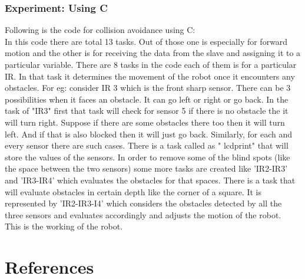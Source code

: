 \documentclass[11pt,a4paper]{book}
\begin{document}
	\subsubsection{Experiment: Using C}
	Following is the code for collision avoidance using C:\\
	
	\newpage
	In this code there are total 13 tasks. Out of those one is especially for forward motion and the other is for receiving the data from the slave and assigning it to a particular variable. There are 8 tasks in the code each of them is for a particular IR. In that task it determines the movement of the robot once it encounters any obstacles. For eg: consider IR 3 which is the front sharp sensor. There can be 3 possibilities when it faces an obstacle. It can go left or right or go back. In the task of "IR3" first that task will check for sensor 5 if there is no obstacle the it will turn right. Suppose if there are some obstacles there too then it will turn left. And if that is also blocked then it will just go back. Similarly, for each and every sensor there are such cases. There is a task called as " lcdprint" that will store the values of the sensors. In order to remove some of the blind spots (like the space between the two sensors) some more tasks are created like 'IR2-IR3' and 'IR3-IR4' which evaluates the obstacles for that spaces. There is a task that will evaluate obstacles in certain depth like the corner of a square. It is represented by 'IR2-IR3-I4' which considers the obstacles detected by all the three sensors and evaluates accordingly and adjusts the motion of the robot.\\
	This is the working of the robot.
	
\newpage

	\section{References}
	
	
\end{document}
